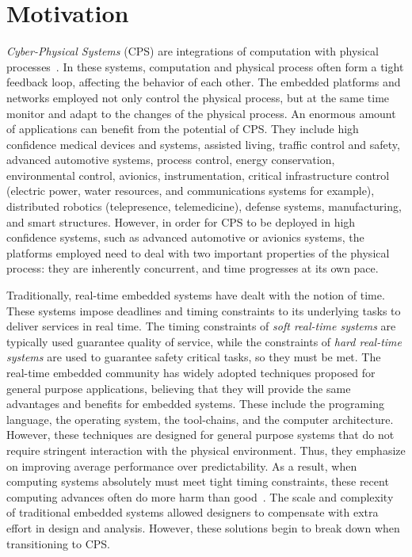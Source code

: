 \section{Motivation}
\emph{Cyber-Physical Systems} (CPS) are integrations of computation with physical processes~.
In these systems, computation and physical process often form a tight feedback loop, affecting the behavior of each other.
The embedded platforms and networks employed not only control the physical process, but at the same time monitor and adapt to the changes of the physical process.
An enormous amount of applications can benefit from the potential of CPS.
They include high confidence medical devices and systems, assisted living, traffic control and safety, advanced automotive systems, process control, energy conservation, environmental control, avionics, instrumentation, critical infrastructure control (electric power, water resources, and communications systems for example), distributed robotics (telepresence, telemedicine), defense systems, manufacturing, and smart structures.
However, in order for CPS to be deployed in high confidence systems, such as advanced automotive or avionics systems, the platforms employed need to deal with two important properties of the physical process: they are inherently concurrent, and time progresses at its own pace.
 

Traditionally, real-time embedded systems have dealt with the notion of time.
These systems impose deadlines and timing constraints to its underlying tasks to deliver services in real time. 
The timing constraints of \emph{soft real-time systems} are typically used guarantee quality of service, while the constraints of \emph{hard real-time systems} are used to guarantee safety critical tasks, so they must be met. 
The real-time embedded community has widely adopted techniques proposed for general purpose applications, believing that they will provide the same advantages and benefits for embedded systems.
These include the programing language, the operating system, the tool-chains, and the computer architecture.
However, these techniques are designed for general purpose systems that do not require stringent interaction with the physical environment. 
Thus, they emphasize on improving average performance over predictability.   
As a result, when computing systems absolutely must meet tight timing constraints, these recent computing advances often do more harm than good~\cite{LeeOnTime2005}.
The scale and complexity of traditional embedded systems allowed designers to compensate with extra effort in design and analysis. 
However, these solutions begin to break down when transitioning to CPS.   

